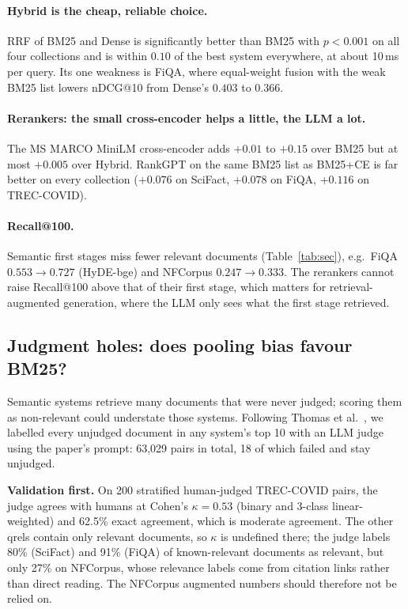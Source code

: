\documentclass[11pt]{article}
\begin{document}
\paragraph{Hybrid is the cheap, reliable choice.} RRF of BM25 and Dense is significantly better than
BM25 with $p<0.001$ on all four collections and is within $0.10$ of the best system everywhere, at
about 10\,ms per query. Its one weakness is FiQA, where equal-weight fusion with the weak BM25 list
lowers nDCG@10 from Dense's $0.403$ to $0.366$.

\paragraph{Rerankers: the small cross-encoder helps a little, the LLM a lot.} The MS MARCO MiniLM
cross-encoder adds $+0.01$ to $+0.15$ over BM25 but at most $+0.005$ over Hybrid. RankGPT on the same
BM25 list as BM25+CE is far better on every collection ($+0.076$ on SciFact, $+0.078$ on FiQA,
$+0.116$ on TREC-COVID).

\paragraph{Recall@100.} Semantic first stages miss fewer relevant documents (Table~\ref{tab:sec}),
e.g.\ FiQA $0.553\to0.727$ (HyDE-bge) and NFCorpus $0.247\to0.333$. The rerankers cannot raise
Recall@100 above that of their first stage, which matters for retrieval-augmented generation, where
the LLM only sees what the first stage retrieved.

\subsection{Judgment holes: does pooling bias favour BM25?}\label{sec:holes}
Semantic systems retrieve many documents that were never judged; scoring them as non-relevant could
understate those systems. Following Thomas et al.~\cite{thomas2024llmjudge}, we labelled every
unjudged document in any system's top 10 with an LLM judge using the paper's prompt: 63,029 pairs
in total, 18 of which failed and stay unjudged.

\textbf{Validation first.} On 200 stratified human-judged TREC-COVID pairs, the judge agrees with
humans at Cohen's $\kappa=0.53$ (binary and 3-class linear-weighted) and 62.5\% exact agreement, which
is moderate agreement. The other qrels contain only relevant documents, so $\kappa$ is undefined there;
the judge labels 80\% (SciFact) and 91\% (FiQA) of known-relevant documents as relevant, but only 27\%
on NFCorpus, whose relevance labels come from citation links rather than direct reading. The
NFCorpus augmented numbers should therefore not be relied on.
\end{document}
